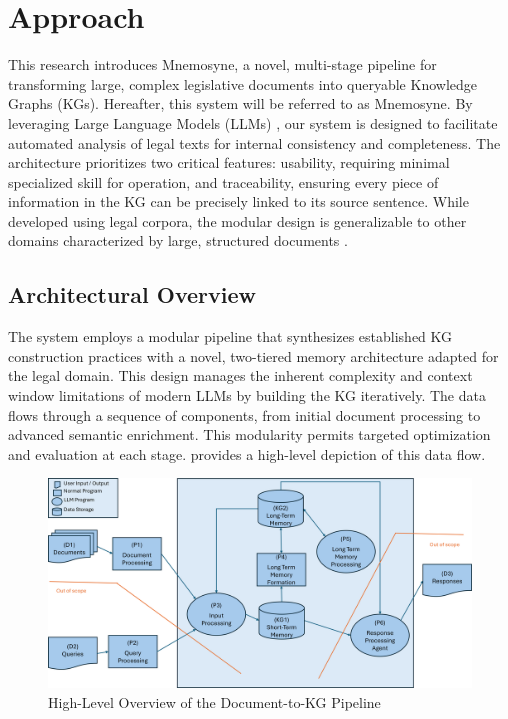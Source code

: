 \section{Approach}
This research introduces Mnemosyne, a novel, multi-stage pipeline for transforming large, complex legislative documents into queryable Knowledge Graphs (KGs). Hereafter, this system will be referred to as Mnemosyne. By leveraging Large Language Models (LLMs) \parencite{RefWorks:RefID:107-benjira2025automated, RefWorks:RefID:162-lairgi2024knowledge}, our system is designed to facilitate automated analysis of legal texts for internal consistency and completeness. The architecture prioritizes two critical features: usability, requiring minimal specialized skill for operation, and traceability, ensuring every piece of information in the KG can be precisely linked to its source sentence. While developed using legal corpora, the modular design is generalizable to other domains characterized by large, structured documents \parencite{RefWorks:RefID:116-shaham2022scrolls}.

\subsection{Architectural Overview}
The system employs a modular pipeline that synthesizes established KG construction practices \parencite{RefWorks:RefID:118-ji2022survey} with a novel, two-tiered memory architecture adapted for the legal domain. This design manages the inherent complexity and context window limitations of modern LLMs \parencite{RefWorks:RefID:99-liu2025comprehensive} by building the KG iteratively. The data flows through a sequence of components, from initial document processing to advanced semantic enrichment. This modularity permits targeted optimization and evaluation at each stage.  provides a high-level depiction of this data flow.

\begin{figure}[htbp]
    \centering
    \includegraphics[width=\linewidth]{figures/chap3_fig/Proposed Architecture.png}
    \caption{High-Level Overview of the Document-to-KG Pipeline}
    \label{fig:proposed_architecture}
\end{figure}

